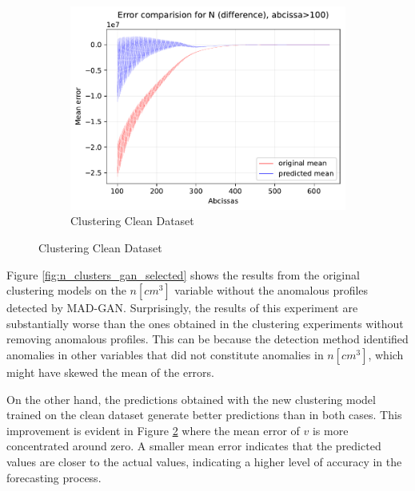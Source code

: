 \begin{figure}[h]
\begin{subfigure}[]{0.48\textwidth}
        \includegraphics[width=\textwidth]{figures/N_error_comparison_after100_clusters_anomaly_gan_selected.pdf}
        \caption{Clustering Clean Dataset}
        \label{fig:n_error_clusters_anomaly_selected}
    \end{subfigure}
\end{figure}

Figure \ref{fig:n_clusters_gan_selected} shows the results from the original clustering models on the $n [cm^3]$ variable without the anomalous profiles detected by MAD-GAN. Surprisingly, the results of this experiment are substantially worse than the ones obtained in the clustering experiments without removing anomalous profiles. This can be because the detection method identified anomalies in other variables that did not constitute anomalies in $n [cm^3]$, which might have skewed the mean of the errors. %

On the other hand, the predictions obtained with the new clustering model trained on the clean dataset generate better predictions than in both cases. This improvement is evident in Figure \ref{fig:n_error_clusters_anomaly_selected} where the mean error of $v$ is more concentrated around zero. A smaller mean error indicates that the predicted values are closer to the actual values, indicating a higher level of accuracy in the forecasting process.


